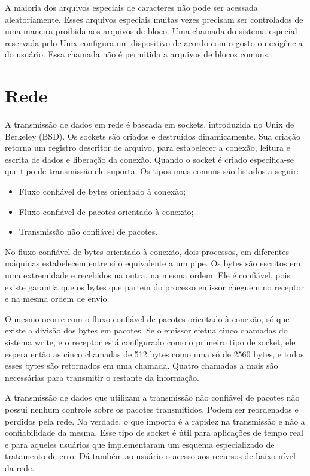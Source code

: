 A maioria dos arquivos especiais de caracteres não pode ser acessada aleatoriamente. Esses arquivos especiais muitas vezes precisam ser controlados de uma maneira proibida aos arquivos de bloco. Uma chamada do sistema especial reservada pelo Unix configura um dispositivo de acordo com o gosto ou exigência do usuário. Essa chamada não é permitida a arquivos de blocos comuns.

\section{Rede}

A transmissão de dados em rede é baseada em sockets, introduzida no Unix de Berkeley (BSD). Os sockets são criados e destruídos dinamicamente. Sua criação retorna um registro descritor de arquivo, para estabelecer a conexão, leitura e escrita de dados e liberação da conexão. Quando o socket é criado especifica-se que tipo de transmissão ele suporta. Os tipos mais comuns são listados a seguir:

\begin{itemize}
\item Fluxo confiável de bytes orientado à conexão;
\item Fluxo confiável de pacotes orientado à conexão;
\item Transmissão não confiável de pacotes.
\end{itemize}

No fluxo confiável de bytes orientado à conexão, dois processos, em diferentes máquinas estabelecem entre si o equivalente a um pipe. Os bytes são escritos em uma extremidade e recebidos na outra, na mesma ordem. Ele é confiável, pois existe garantia que os bytes que partem do processo emissor cheguem no receptor e na mesma ordem de envio.

O mesmo ocorre com o fluxo confiável de pacotes orientado à conexão, só que existe a divisão dos bytes em pacotes. Se o emissor efetua cinco chamadas do sistema write, e o receptor está configurado como o primeiro tipo de socket, ele espera então as cinco chamadas de 512 bytes como uma só de 2560 bytes, e todos esses bytes são retornados em uma chamada. Quatro chamadas a mais são necessárias para transmitir o restante da informação.

A transmissão de dados que utilizam a transmissão não confiável de pacotes não possui nenhum controle sobre os pacotes transmitidos. Podem ser reordenados e perdidos pela rede. Na verdade, o que importa é a rapidez na transmissão e não a confiabilidade da mesma. Esse tipo de socket é útil para aplicações de tempo real e para aqueles usuários que implementaram um esquema especializado de tratamento de erro. Dá também ao usuário o acesso aos recursos de baixo nível da rede.


